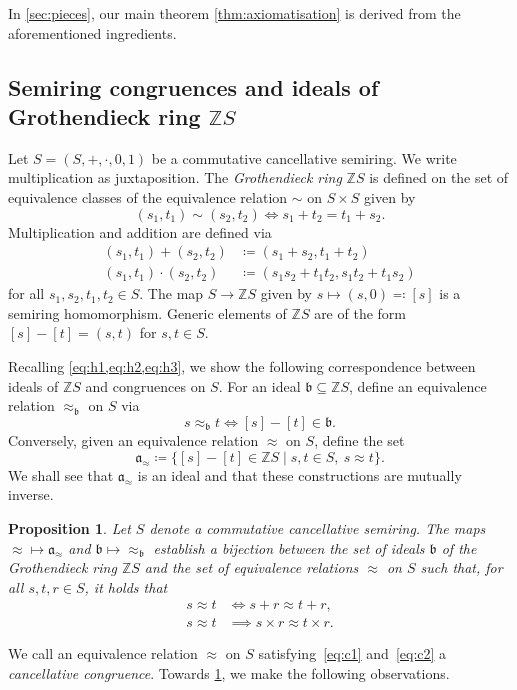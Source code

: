 \documentclass[11pt]{scrartcl}
\theoremstyle{definition}
\theoremstyle{plain}
\newtheorem{proposition}[definition]{Proposition}
\theoremstyle{remark}
\begin{document}
	In \cref{sec:pieces}, our main theorem \ref{thm:axiomatisation} is derived from the aforementioned ingredients.

	\subsection{Semiring congruences and ideals of Grothendieck ring \texorpdfstring{$\mathbb{Z}S$}{ZS}}
	\label{sec:zs}

	Let $S = (S, +, \cdot, 0, 1)$ be a commutative cancellative semiring.
	We write multiplication as juxtaposition.
	The \emph{Grothendieck ring} $\mathbb{Z}S$
	is defined on the set of equivalence classes of the equivalence relation $\sim$ on $S \times S$ given by
	\[
		(s_1, t_1) \sim (s_2, t_2) \iff s_1 + t_2 = t_1 + s_2.
	\]
	Multiplication and addition are defined via
	\begin{align*}
		(s_1, t_1) + (s_2, t_2) &\coloneqq (s_1 + s_2, t_1 + t_2)\\
		(s_1, t_1) \cdot (s_2, t_2) &\coloneqq (s_1s_2 + t_1 t_2 , s_1 t_2 + t_1 s_2)
	\end{align*}
	for all $s_1, s_2, t_1, t_2 \in S$.
	The map $S \to \mathbb{Z}S$ given by $s \mapsto (s, 0) \eqqcolon [s]$ is a semiring homomorphism.
	Generic elements of $\mathbb{Z}S$ are of the form $[s] - [t] = (s, t)$ for $s, t\in S$.

	Recalling \cref{eq:h1,eq:h2,eq:h3}, we show the following correspondence between ideals of $\mathbb{Z}S$ and congruences on $S$.
	For an ideal $\mathfrak{b} \subseteq \mathbb{Z}S$,
	define an equivalence relation $\approx_{\mathfrak{b}}$ on $S$ via
	\[
		s \approx_{\mathfrak{b}} t \iff [s] - [t] \in \mathfrak{b}.
	\]
	Conversely, given an equivalence relation $\approx$ on $S$,
	define the set
	\[
		\mathfrak{a}_{\approx} \coloneqq \{[s] - [t] \in \mathbb{Z}S \mid s, t \in S, \ s \approx t\}.
	\]
	We shall see that $\mathfrak{a}_{\approx}$ is an ideal and that these constructions are mutually inverse.
	
	\begin{proposition}\label{prop:ideals-to-relations}
		Let $S$ denote a commutative cancellative semiring.
		The maps ${\approx} \mapsto \mathfrak{a}_{\approx }$
		and  $\mathfrak{b} \mapsto {\approx_{\mathfrak{b}}}$
		establish a bijection between the set of ideals $\mathfrak{b}$ of the Grothendieck ring $\mathbb{Z}S$ 
		and the set of equivalence relations $\approx$ on $S$
		such that, for all $s, t, r \in S$, it holds that 
		\begin{align}
			s \approx t &\iff s + r \approx t + r, \label{eq:c1}\\
			s \approx t &\implies s \times r \approx t \times r. \label{eq:c2}
		\end{align}
	\end{proposition}
	We call an equivalence relation $\approx$ on $S$ satisfying~\eqref{eq:c1} and~\eqref{eq:c2} a \emph{cancellative congruence}.
	Towards \cref{prop:ideals-to-relations}, we make the following observations.
\end{document}
